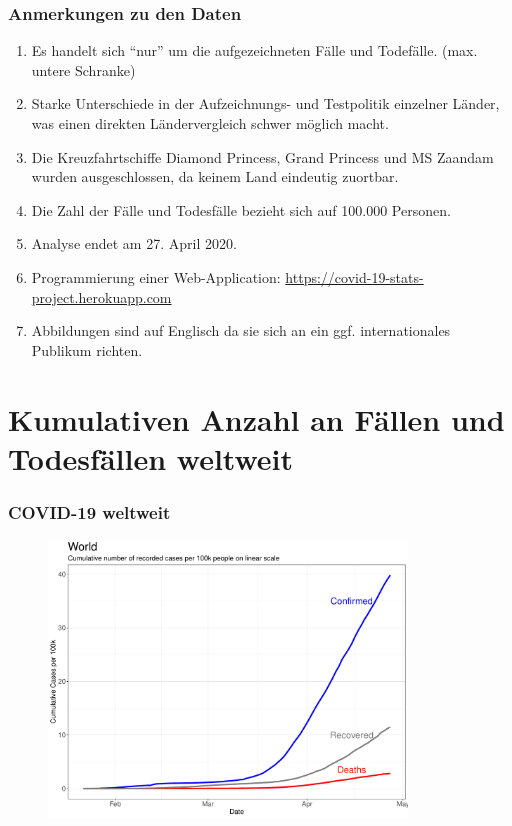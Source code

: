 \documentclass{beamer}
\begin{document}
 \begin{frame}
 	\frametitle{Anmerkungen zu den Daten}
 	\begin{enumerate}
 		\item Es handelt sich ``nur'' um die aufgezeichneten Fälle und Todefälle. (max. untere Schranke)
 		\item Starke Unterschiede in der Aufzeichnungs- und Testpolitik einzelner Länder, was einen direkten Ländervergleich schwer möglich macht. 
 		\item Die Kreuzfahrtschiffe Diamond Princess, Grand Princess und MS Zaandam wurden ausgeschlossen, da keinem Land eindeutig zuortbar. 
 		\item Die Zahl der Fälle und Todesfälle bezieht sich auf 100.000 Personen.
 		\item Analyse endet am 27. April 2020.
 		\pause
 		\item Programmierung einer Web-Application: \url{https://covid-19-stats-project.herokuapp.com}
 		\item Abbildungen sind auf Englisch da sie sich an ein ggf. internationales Publikum richten.
 	\end{enumerate}
 \end{frame}
 
 \section{Kumulativen Anzahl an Fällen und Todesfällen weltweit}
 \begin{frame}
 	\frametitle{COVID-19 weltweit}
	\begin{figure}
		\centering
		\includegraphics[width = 270pt]{Cases_world.pdf}
	\end{figure}
 \end{frame}
\end{document}
